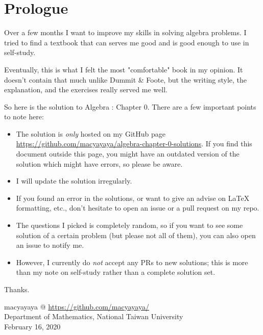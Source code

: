 \begin{center}
\end{center}
    
\newpage

\chapter{Prologue}
Over a few months I want to improve my skills in solving algebra problems. I tried to find a textbook that can serves me good and is good enough to use in self-study. 

Eventually, this is what I felt the most "comfortable" book in my opinion. It doesn't contain that much unlike Dummit \& Foote, but the writing style, the explanation, and the exercises really served me well.

So here is the solution to Algebra : Chapter 0. There are a few important points to note here:
\begin{itemize}
    \item The solution is \emph{only} hosted on my GitHub page \href{https://github.com/macyayaya/algebra-chapter-0-solutions}{https://github.com/macyayaya/algebra-chapter-0-solutions}. If you find this document outside this page, you might have an outdated version of the solution which might have errors, so please be aware.
    \item I will update the solution irregularly.
    \item If you found an error in the solutions, or want to give an advise on LaTeX formatting, etc., don't hesitate to open an issue or a pull request on my repo. 
    \item The questions I picked is completely random, so if you want to see some solution of a certain problem (but please not all of them), you can also open an issue to notify me. 
    \item However, I currently do \emph{not} accept any PRs to new solutions; this is more than my note on self-study rather than a complete solution set.
\end{itemize}

Thanks. 

\begin{flushright}
macyayaya @ \href{https://github.com/macyayaya/}{https://github.com/macyayaya/} \\
Department of Mathematics, National Taiwan University \\
February 16, 2020
\end{flushright}
